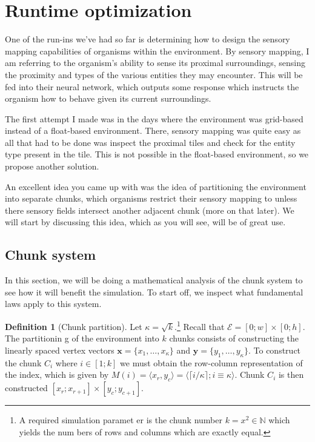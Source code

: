 \documentclass[a4paper, 12pt]{report}
\theoremstyle{definition}
\newtheorem{definition}{Definition}[chapter]
\begin{document}
\section{Runtime optimization}
One of the run-ins we've had so far is determining how to design the sensory mapping capabilities of organisms within the environment. By sensory mapping, I am referring to the organism's ability to sense its
proximal surroundings, sensing the proximity and types of the various entities they may encounter. This will be fed into their neural network, which outputs some response which instructs the organism how to behave
given its current surroundings.
\par The first attempt I made was in the days where the environment was grid-based instead of a float-based environment. There, sensory mapping was quite easy as all that had to be done was inspect the proximal tiles
and check for the entity type present in the tile. This is not possible in the float-based environment, so we propose another solution.
\par An excellent idea you came up with was the idea of partitioning the environment into separate chunks, which organisms restrict their sensory mapping to unless there sensory fields intersect another adjacent chunk
(more on that later). We will start by discussing this idea, which as you will see, will be of great use.

\subsection{Chunk system}
In this section, we will be doing a mathematical analysis of the chunk system to see how it will benefit the simulation. To start off, we inspect what fundamental laws apply to this system.

\begin{definition}[Chunk partition]
    Let $\kappa = \sqrt k$.\footnote{A required simulation paramet
    er is the chunk number $k = x^2 \in \mathbb N$ which yields the num
    bers of rows and columns which are exactly equal.}
    Recall that $\mathscr E = [0;w] \times [0;h]$. The partitionin
    g of the environment into $k$ chunks consists of constructing the linearly spaced vertex vectors 
    $\mathbf x = \{x_1, \ldots, x_\kappa \}$ and $\mathbf y = \{y_1, \ldots, y_\kappa \}$.
    To construct the chunk $C_i$ where $i \in [1;k]$ we must obtain the row-column representation of the index,
    which is given by $M(i) = \langle x_r, y_c \rangle = \langle \lceil i / \kappa \rceil; i \equiv \kappa \rangle$. 
    Chunk $C_i$ is then constructed $[x_r; x_{r + 1}] \times [y_c; y_{c + 1}]$.
\end{definition}
\end{document}
